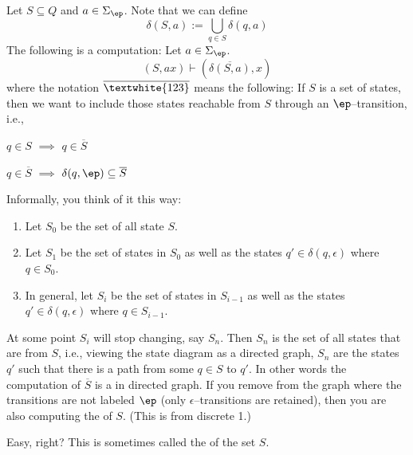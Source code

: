 \newpage
\begin{defn}
Let $S \subseteq Q$ and $a \in \Sigma_\ep$. Note that we can
define
\[
 \delta(S,a) := \bigcup_{q \in S} \delta(q,a)
\]
The following is a computation: Let $a \in \Sigma_\ep$.
\[ (S,ax) \vdash (\overline{\delta(S,a)}, x) \]
where the notation $\overline{\textwhite{123}}$ means the following: If $S$ is a
set of states, then we want to include those states reachable from
$S$ through an $\ep$--transition, i.e.,
 \begin{tightlist}
  \item $q \in S$ $\implies$ $q \in \overline{S}$
  \item $q \in \overline{S}$ $\implies$ $\delta(q,\ep) \subseteq
  \overline{S}$
 \end{tightlist}
\end{defn}
Informally, you think of it this way:
\begin{enumerate}
\item Let $S_0$ be the set of all
  state $S$.
\item
  Let $S_1$ be the set of states in $S_0$
  as well as the states $q' \in \delta(q, \epsilon)$
  where $q \in S_0$.
\item
  In general,
  let $S_i$ be the set of states in $S_{i-1}$
  as well as the states $q' \in \delta(q, \epsilon)$
  where $q \in S_{i-1}$.
\end{enumerate}
At some point $S_i$ will stop changing, say $S_n$.
Then $S_n$ is the set of all states that are
 from $S$, i.e.,
viewing the state diagram as a directed graph,
$S_n$ are the states $q'$ such that there is a path
from some $q \in S$ to $q'$.
In other words the computation of $\overline{S}$ is a
 in directed graph.
If you remove from the graph where the transitions are
not labeled $\ep$ (only $\epsilon$--transitions are retained), then you are
also computing the  of $S$.
(This is from discrete 1.)

Easy, right?
This is sometimes called the  of the
set $S$.

